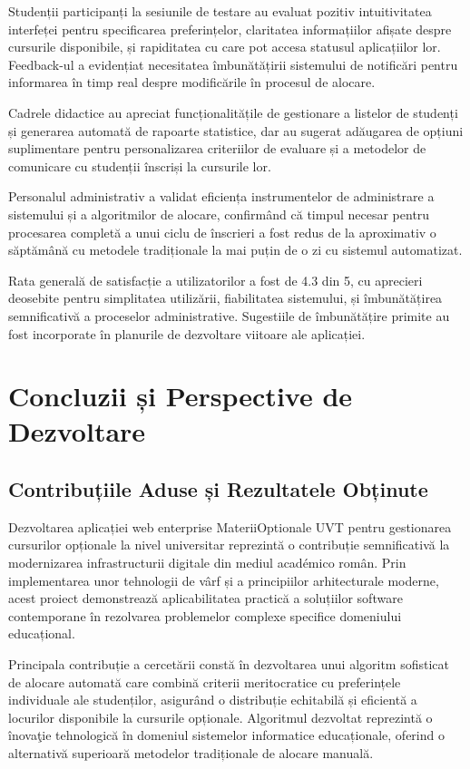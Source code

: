 \documentclass[12pt,a4paper]{report}
\begin{document}
Studenții participanți la sesiunile de testare au evaluat pozitiv intuitivitatea interfeței pentru specificarea preferințelor, claritatea informațiilor afișate despre cursurile disponibile, și rapiditatea cu care pot accesa statusul aplicațiilor lor. Feedback-ul a evidențiat necesitatea îmbunătățirii sistemului de notificări pentru informarea în timp real despre modificările în procesul de alocare.

Cadrele didactice au apreciat funcționalitățile de gestionare a listelor de studenți și generarea automată de rapoarte statistice, dar au sugerat adăugarea de opțiuni suplimentare pentru personalizarea criteriilor de evaluare și a metodelor de comunicare cu studenții înscriși la cursurile lor.

Personalul administrativ a validat eficiența instrumentelor de administrare a sistemului și a algoritmilor de alocare, confirmând că timpul necesar pentru procesarea completă a unui ciclu de înscrieri a fost redus de la aproximativ o săptămână cu metodele tradiționale la mai puțin de o zi cu sistemul automatizat.

Rata generală de satisfacție a utilizatorilor a fost de 4.3 din 5, cu aprecieri deosebite pentru simplitatea utilizării, fiabilitatea sistemului, și îmbunătățirea semnificativă a proceselor administrative. Sugestiile de îmbunătățire primite au fost incorporate în planurile de dezvoltare viitoare ale aplicației.

\chapter{Concluzii și Perspective de Dezvoltare}

\section{Contribuțiile Aduse și Rezultatele Obținute}

Dezvoltarea aplicației web enterprise MateriiOptionale UVT pentru gestionarea cursurilor opționale la nivel universitar reprezintă o contribuție semnificativă la modernizarea infrastructurii digitale din mediul académico român. Prin implementarea unor tehnologii de vârf și a principiilor arhitecturale moderne, acest proiect demonstrează aplicabilitatea practică a soluțiilor software contemporane în rezolvarea problemelor complexe specifice domeniului educațional.

Principala contribuție a cercetării constă în dezvoltarea unui algoritm sofisticat de alocare automată care combină criterii meritocratice cu preferințele individuale ale studenților, asigurând o distribuție echitabilă și eficientă a locurilor disponibile la cursurile opționale. Algoritmul dezvoltat reprezintă o înovaţie tehnologică în domeniul sistemelor informatice educaționale, oferind o alternativă superioară metodelor tradiționale de alocare manuală.
\end{document}
